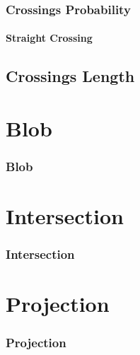 \documentclass{beamer}
\begin{document}
	
	\begin{frame}
		\frametitle{Crossings Probability}
		\framesubtitle{Straight Crossing}
	\end{frame}

	\subsection{Crossings Length}
	
	\section{Blob}
	\begin{frame}
	    \frametitle{Blob}
	    
	\end{frame}

	\section{Intersection}
	\begin{frame}
		\frametitle{Intersection}
		
	\end{frame}

	\section{Projection}
	\begin{frame}
		\frametitle{Projection}
		
	\end{frame}

	
\end{document}
